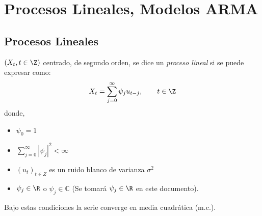 \chapter{Procesos Lineales, Modelos ARMA}

\section{Procesos Lineales}

\begin{definicion}
$\left({X_{t}, t\in \Z} \right)$ centrado, de segundo orden, se dice un \emph{proceso lineal} si se puede expresar como:
\begin{equation}
\label{eq1}
X_{t} =\sum_{j=0}^\infty {\psi_{j} u_{t-j}}, \qquad t\in \Z
\end{equation}
donde,
\begin{itemize}
 \item $\psi_{0}=1$
 \item $\displaystyle\sum\limits_{j=0}^\infty \left| \psi_{j} \right|^{2} <\infty $
 \item $\left( u_{t} \right)_{t\in Z}$ es un ruido blanco de varianza $\sigma^{2}$
 \item $\psi_{j} \in \R$ o $\psi_{j} \in \mathbb{C}$ (Se tomar\'{a} $\psi_{j} \in \R$ en este documento). 
\end{itemize}
\end{definicion}

Bajo estas condiciones la serie converge en media cuadr\'{a}tica (m.c.).

